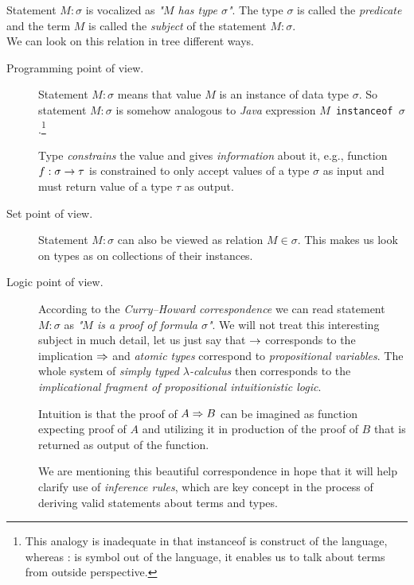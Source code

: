 \documentclass[12pt,a4paper]{report}
\newcommand{\lets}{let us\xspace}
\begin{document}
Statement $M : \sigma$ is vocalized as {\it "$M$ has type $\sigma$"}.
The type $\sigma$ is called the {\it predicate} and 
the term $M$ is called the {\it subject} of the statement $M : \sigma$. \\

We can look on this relation in tree different ways.

\begin{description}
  \item[Programming point of view.] 
   Statement $M : \sigma$ means that value $M$ is 
   an instance of data type
   $\sigma$. So statement $M : \sigma$ is
   somehow analogous to \textit{Java}
   expression \texttt{$M$ instanceof $\sigma$}.\footnote{
   This analogy is inadequate in that instanceof is
   construct of the language, whereas : is symbol
   out of the language, it enables us to talk about
   terms from outside perspective.  }    
   
   Type \textit{constrains} the value 
   and gives \textit{information} about it, 
   e.g., function $f : \sigma \rightarrow \tau$ 
   is constrained to only accept values of a type $\sigma$
   as input and must return value of a type $\tau$ as output.
     
  \item[Set point of view.] 
     Statement $M : \sigma$ can also be viewed as relation
     $M \in \sigma$. This makes us look on types as on
     collections of their instances.
      
  \item[Logic point of view.] According to 
  the \textit{Curry–Howard correspondence}
  we can read statement $M : \sigma$ as 
  \textit{"$M$ is a proof of formula $\sigma$"}.
  We will not treat this interesting subject in much detail,
  \lets just say that $\rightarrow$ corresponds to the
  implication $\Rightarrow$ and \textit{atomic types} correspond to
  \textit{propositional variables}. The whole system of
  \textit{simply typed $\lambda$-calculus} then corresponds
  to the \textit{implicational fragment of propositional 
  intuitionistic logic}.
   
  Intuition is that the proof of $A \Rightarrow B$ 
  can be imagined as function expecting proof of $A$
  and utilizing it in production of the proof of $B$
  that is returned as output of the function. 
    
  We are mentioning this beautiful
  correspondence in hope that it will help clarify 
  use of \textit{inference rules}, which are key concept
  in the process of deriving valid statements about
  terms and types.  
      
\end{description}  	
	
\end{document}
